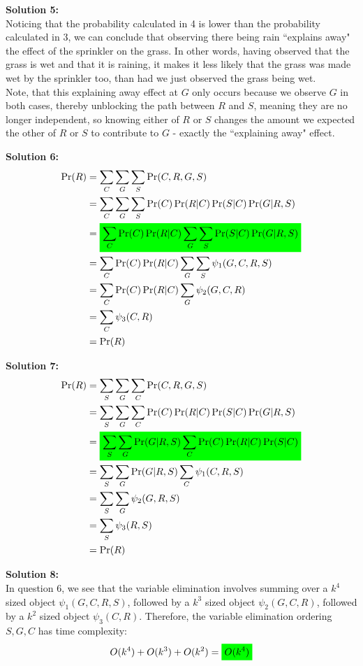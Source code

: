 \documentclass[submit]{harvardml}
\newcommand{\mathcolorbox}[2]{\colorbox{#1}{$\displaystyle #2$}}
\begin{document}
\textbf{Solution 5:}\\
Noticing that the probability calculated in 4 is lower than the probability calculated in 3, we can conclude that observing there being rain ``explains away" the effect of the sprinkler on the grass. In other words, having observed that the grass is wet and that it is raining, it makes it less likely that the grass was made wet by the sprinkler too, than had we just observed the grass being wet.\\

Note, that this explaining away effect at $G$ only occurs because we observe $G$ in both cases, thereby unblocking the path between $R$ and $S$, meaning they are no longer independent, so knowing either of $R$ or $S$ changes the amount we expected the other of $R$ or $S$ to contribute to $G$ - exactly the ``explaining away" effect.
\newpage

\textbf{Solution 6:}\\
\begin{align*}
    \Pr(R) &= \sum_C \sum_G \sum_S \Pr(C,R,G,S)\\
    &= \sum_C \sum_G \sum_S \Pr(C)\Pr(R|C)\Pr(S|C)\Pr(G | R, S)\\
    &= \mathcolorbox{green}{\sum_C \Pr(C)\Pr(R|C) \sum_G \sum_S \Pr(S|C)\Pr(G | R, S)}\\
    &= \sum_C \Pr(C)\Pr(R|C) \sum_G \sum_S \psi_1(G,C,R,S)\\
    &= \sum_C \Pr(C)\Pr(R|C) \sum_G \psi_2(G,C,R)\\
    &= \sum_C \psi_3(C,R)\\
    &= \Pr(R)
\end{align*}

\textbf{Solution 7:}\\
\begin{align*}
    \Pr(R) &= \sum_S \sum_G \sum_C \Pr(C,R,G,S)\\
    &= \sum_S \sum_G \sum_C \Pr(C)\Pr(R|C)\Pr(S|C)\Pr(G | R, S)\\
    &= \mathcolorbox{green}{\sum_S \sum_G \Pr(G | R, S) \sum_C \Pr(C)\Pr(R|C)\Pr(S|C)}\\
    &= \sum_S \sum_G \Pr(G | R, S) \sum_C \psi_1(C,R,S)\\
    &= \sum_S \sum_G \psi_2(G,R,S)\\
    &= \sum_S \psi_3(R,S)\\
    &= \Pr(R)
\end{align*}

\textbf{Solution 8:}\\
In question 6, we see that the variable elimination involves summing over a $k^4$ sized object $\psi_1(G,C,R,S)$, followed by a $k^3$ sized object $\psi_2(G,C,R)$, followed by a $k^2$ sized object $\psi_3(C,R)$. Therefore, the variable elimination ordering $S,G,C$ has time complexity:
$$O(k^4)+O(k^3)+O(k^2) = \mathcolorbox{green}{O(k^4)}$$
\end{document}
